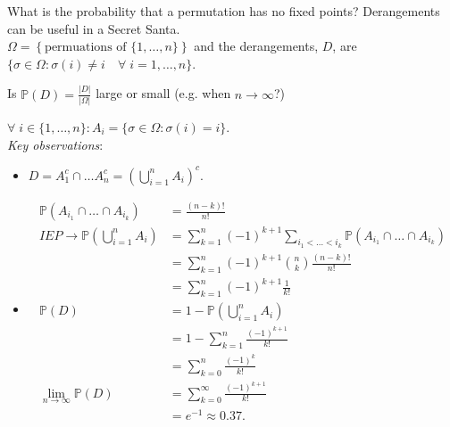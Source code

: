 \begin{example}[Derangements]
    What is the probability that a permutation has no fixed points? Derangements can be useful in a Secret Santa. \\
    $\Omega = \left\{\text{permuations of } \{1, \dots, n\} \right\}$ and the derangements, $D$, are $\{\sigma \in \Omega : \sigma(i) \neq i \quad \forall \; i = 1, \dots, n\}$.
    \begin{question}
        Is $\mathbb{P}(D) = \frac{|D|}{|\Omega|}$ large or small (e.g. when $n \to \infty$?)
    \end{question} 
    $\forall \; i \in \{1, \dots, n\} : A_i = \{\sigma \in \Omega : \sigma(i) = i\}$. \\
    \emph{Key observations}:
    \begin{itemize}
        \item $D = A_1^c \cap \dots A_n^c = \left(\bigcup_{i = 1}^n A_i \right)^c.$
        \item \begin{align*}
            \mathbb{P}(A_{i_1} \cap \dots \cap A_{i_k}) &= \frac{(n - k)!}{n!} \\
            IEP \to \mathbb{P}\left(\bigcup_{i = 1}^n A_i \right) &= \sum_{k=1}^{n} (-1)^{k + 1} \sum_{i_1 < \dots < i_k} \mathbb{P}(A_{i_1} \cap \dots \cap A_{i_k}) \\
            &= \sum_{k=1}^{n} (-1)^{k+1} \binom{n}{k} \frac{(n - k)!}{n!} \\
            &= \sum_{k=1}^{n} (-1)^{k+1} \frac{1}{k!} \\
            \mathbb{P}(D) &= 1 - \mathbb{P}\left(\bigcup_{i = 1}^n A_i \right) \\
            &= 1 - \sum_{k=1}^{n} \frac{(-1)^{k+1}}{k!} \\
            &= \sum_{k=0}^{n} \frac{(-1)^{k}}{k!} \\
            \lim_{n \to \infty} \mathbb{P}(D) &= \sum_{k=0}^{\infty} \frac{(-1)^{k+1}}{k!} \\
            &= e^{-1} \approx 0.37.
        \end{align*} 
    \end{itemize}


\end{example}
